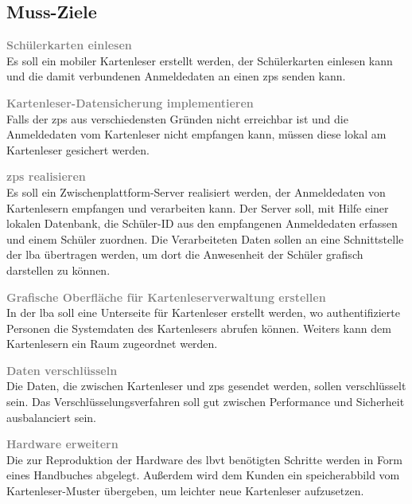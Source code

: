 \subsection{Muss-Ziele}
\begin{coloritemize}
    \item \textbf{\textcolor{gray}{Schülerkarten einlesen}}  \\ 
        Es soll ein mobiler Kartenleser erstellt werden, der Schülerkarten einlesen kann und die damit verbundenen Anmeldedaten an einen \gls{zps} senden kann. 
    
    \item \textbf{\textcolor{gray}{Kartenleser-Datensicherung implementieren}}  \\ 
        Falls der \gls{zps} aus verschiedensten Gründen nicht erreichbar ist und die Anmeldedaten vom Kartenleser nicht empfangen kann, müssen diese lokal am Kartenleser gesichert werden. 
        
    \item \textbf{\textcolor{gray}{\gls{zps} realisieren}}  \\
        Es soll ein Zwischenplattform-Server realisiert werden, der Anmeldedaten von Kartenlesern empfangen und verarbeiten kann. Der Server soll, mit Hilfe einer lokalen Datenbank, die Schüler-ID aus den empfangenen Anmeldedaten erfassen und einem Schüler zuordnen. Die Verarbeiteten Daten sollen an eine Schnittstelle der \gls{lba} übertragen werden, um dort die Anwesenheit der Schüler grafisch darstellen zu können.
        
    \item \textbf{\textcolor{gray}{Grafische Oberfläche für Kartenleserverwaltung erstellen}}  \\ 
        In der \gls{lba} soll eine Unterseite für Kartenleser erstellt werden, wo authentifizierte Personen die Systemdaten des Kartenlesers abrufen können. Weiters kann dem Kartenlesern ein Raum zugeordnet werden.
        
    \item \textbf{\textcolor{gray}{Daten verschlüsseln}}  \\
        Die Daten, die zwischen Kartenleser und \gls{zps} gesendet werden, sollen verschlüsselt sein. Das Verschlüsselungsverfahren soll gut zwischen Performance und Sicherheit ausbalanciert sein.
        
    \item \textbf{\textcolor{gray}{Hardware erweitern}}  \\
        Die zur Reproduktion der Hardware des \gls{lbvt} benötigten Schritte werden in Form eines Handbuches abgelegt. Außerdem wird dem Kunden ein \gls{speicherabbild} vom Kartenleser-Muster übergeben, um leichter neue Kartenleser aufzusetzen.
    
\end{coloritemize}
\newpage

